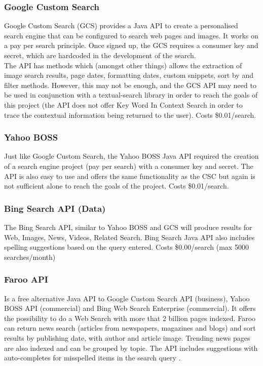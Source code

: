 \documentclass[10pt]{article}
\begin{document}
\subsubsection{Google Custom Search}
Google Custom Search (GCS) provides a Java API to create a personalised search engine that can be configured to search web pages and images. It works on a pay per search principle. Once signed up, the GCS requires a consumer key and secret, which are hardcoded in the development of the search.\\
The API has methods which (amongst other things) allows the extraction of image search results, page dates, formatting dates, custom snippets, sort by and filter methods. However, this may not be enough, and the GCS API may need to be used in conjunction with a textual-search library in order to reach the goals of this project (the API does not offer Key Word In Context Search in order to trace the contextual information being returned to the user). Costs \$0.01/search.

\subsubsection{Yahoo BOSS}
Just like Google Custom Search, the Yahoo BOSS Java API required the creation of a search engine project (pay per search) with a consumer key and secret. The API is also easy to use and offers the same functionality as the CSC but again is not sufficient alone to reach the goals of the project. Costs \$0.01/search.

\subsubsection{Bing Search API (Data)}
The Bing Search API, similar to Yahoo BOSS and GCS will produce results for Web, Images, News, Videos, Related Search. Bing Search Java API also includes spelling suggestions based on the query entered. Costs \$0.00/search (max 5000 searches/month)

\subsubsection{Faroo API}
Is a free alternative Java API to Google Custom Search API (business), Yahoo BOSS API  (commercial) and Bing Web Search Enterprise (commercial). It offers the possibility to do a Web Search with more that 2 billion pages indexed. Faroo can return news search (articles from newspapers, magazines and blogs) and sort results by publishing date, with author and article image. Trending news pages are also indexed and can be grouped by topic. The API includes suggestions with auto-completes for misspelled items in the search query \cite{faroo}.
\end{document}
